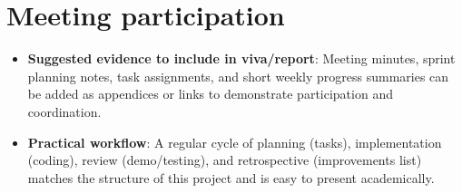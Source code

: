 \documentclass[12pt,a4paper]{article}
\begin{document}
\section{Meeting participation}
\begin{itemize}[leftmargin=*, itemsep=0.4em]
  \item \textbf{Suggested evidence to include in viva/report}: Meeting minutes, sprint planning notes, task assignments, and short weekly progress summaries can be added as appendices or links to demonstrate participation and coordination.
  \item \textbf{Practical workflow}: A regular cycle of planning (tasks), implementation (coding), review (demo/testing), and retrospective (improvements list) matches the structure of this project and is easy to present academically.
\end{itemize}
\end{document}
